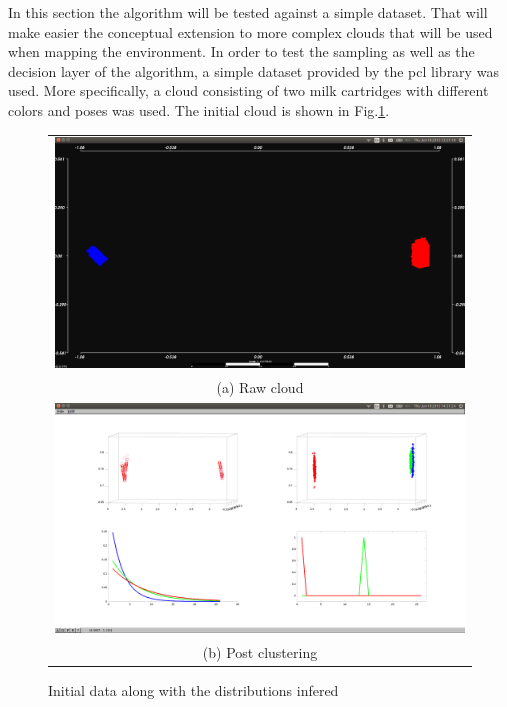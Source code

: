 \documentclass[twoside,hidelinks]{article}
\begin{document}
In this section the algorithm will be tested against a simple dataset. That will make easier the conceptual extension to more complex clouds that will be used when mapping the environment. In order to test the sampling as well as the decision layer of the algorithm, a simple dataset provided by the pcl\cite{pcl} library was used. More specifically, a cloud consisting of two milk cartridges with different colors and poses was used. The initial cloud is shown in Fig.\ref{pcl:clust}. 
\begin{figure}
\begin{tabular}{c}
  \includegraphics[width=1\textwidth]{clusterings/initialData} \\
  (a) Raw cloud  \\
   \includegraphics[width=1\textwidth]{clusterings/colorcodedDistributions} \\
 (b) Post clustering \\[6pt]
\end{tabular}
\caption{Initial data along with the distributions infered}
  \label{pcl:clust}
\end{figure}
\end{document}
